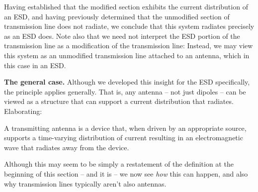 Having established that the modified section exhibits the current distribution of an ESD, and having previously determined that the unmodified section of transmission line does not radiate, we conclude that this system radiates precisely as an ESD does.  
Note also that we need not interpret the ESD portion of the transmission line as a modification of the transmission line: Instead, we may view this system as an unmodified transmission line attached to an antenna, which in this case in an ESD. 

{\bf The general case.}
Although we developed this insight for the ESD specifically, the principle applies generally.
That is, any antenna -- not just dipoles -- can be viewed as a structure that can support a current distribution that radiates.
Elaborating:
%
\begin{mdframed}[backgroundcolor=yellow!20,nobreak=true] 
A transmitting antenna is a device that, when driven by an appropriate source, supports a time-varying distribution of current resulting in an electromagnetic wave that radiates away from the device.
\end{mdframed}
%
Although this may seem to be simply a restatement of the definition at the beginning of this section -- and it is -- we now see \emph{how} this can happen, and also why transmission lines typically aren't also antennas. 


